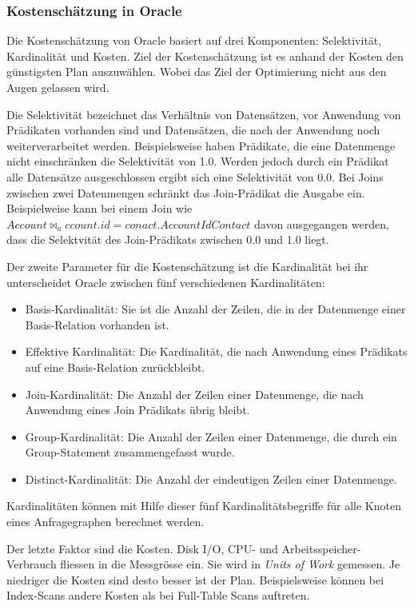 \subsubsection{Kostenschätzung in Oracle}
Die Kostenschätzung von Oracle basiert auf drei Komponenten: Selektivität, Kardinalität und Kosten. Ziel der Kostenschätzung ist es anhand der Kosten den günstigsten Plan auszuwählen. Wobei das Ziel der Optimierung nicht aus den Augen gelassen wird.

Die Selektivität bezeichnet das Verhältnis von Datensätzen, vor Anwendung von Prädikaten vorhanden sind und Datensätzen, die nach der Anwendung noch weiterverarbeitet werden. Beispielsweise haben Prädikate, die eine Datenmenge nicht einschränken die Selektivität von 1.0. Werden jedoch durch ein Prädikat alle Datensätze ausgeschlossen ergibt sich eine Selektivität von 0.0. Bei Joins zwischen zwei Datenmengen schränkt das Join-Prädikat die Ausgabe ein. Beispielweise kann bei einem Join wie $Account \Join_account.id=conact.AccountId Contact$ davon ausgegangen werden, dass die Selektvität des Join-Prädikats zwischen 0.0 und 1.0 liegt.

Der zweite Parameter für die Kostenschätzung ist die Kardinalität bei ihr unterscheidet Oracle zwischen fünf verschiedenen Kardinalitäten:

\begin{itemize}
\item Basis-Kardinalität: Sie ist die Anzahl der Zeilen, die in der Datenmenge einer Basis-Relation vorhanden ist.
\item Effektive Kardinalität: Die Kardinalität, die nach Anwendung eines Prädikats auf eine Basis-Relation zurückbleibt.
\item Join-Kardinalität: Die Anzahl der Zeilen einer Datenmenge, die nach Anwendung eines Join Prädikats übrig bleibt.
\item Group-Kardinalität: Die Anzahl der Zeilen einer Datenmenge, die durch ein Group-Statement zusammengefasst wurde.
\item Distinct-Kardinalität: Die Anzahl der eindeutigen Zeilen einer Datenmenge.
\end{itemize}

Kardinalitäten können mit Hilfe dieser fünf Kardinalitätsbegriffe für alle Knoten eines Anfragegraphen berechnet werden.

Der letzte Faktor sind die Kosten. Disk I/O, CPU- und Arbeitsspeicher-Verbrauch fliessen in die Messgrösse ein. Sie wird in \textit{Units of Work} gemessen. Je niedriger die Kosten sind desto besser ist der Plan. Beispielsweise können bei Index-Scans andere Kosten als bei Full-Table Scans auftreten.






